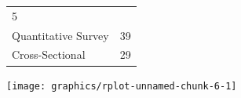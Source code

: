 \documentclass[]{tufte-handout}
\begin{document}
\begin{longtable}[]{@{}ll@{}}
\begin{minipage}[t]{0.21\columnwidth}
5\strut
\end{minipage}\tabularnewline
\begin{minipage}[t]{0.42\columnwidth}\raggedright\strut
Quantitative Survey\strut
\end{minipage} & \begin{minipage}[t]{0.21\columnwidth}\raggedright\strut
39\strut
\end{minipage}\tabularnewline
\begin{minipage}[t]{0.42\columnwidth}\raggedright\strut
Cross-Sectional\strut
\end{minipage} & \begin{minipage}[t]{0.21\columnwidth}\raggedright\strut
29\strut
\end{minipage}\tabularnewline
\bottomrule
\end{longtable}

\texttt{[image: graphics/rplot-unnamed-chunk-6-1]}

\newpage

\end{document}
